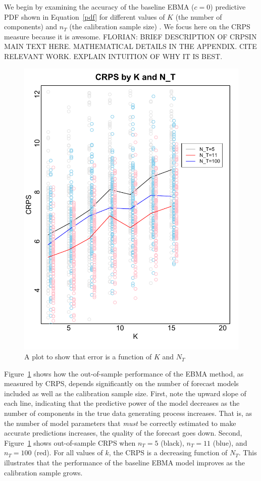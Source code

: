 \documentclass[12pt,fullpage,endnotes]{article}
\begin{document}
We begin by examining the accuracy of the baseline EBMA ($c=0$)
predictive PDF shown in Equation~\ref{pdf} for different values of $K$
(the number of components) and $n_{T}$ (the calibration sample size) .
We focus here on the CRPS measure because it is awesome.  FLORIAN:
BRIEF DESCRIPTION OF CRPSIN MAIN TEXT HERE. MATHEMATICAL DETAILS IN
THE APPENDIX.  CITE RELEVANT WORK.  EXPLAIN INTUITION OF WHY IT IS
BEST.

\begin{figure}[ht]
\caption{A plot to show that error is a function of $K$ and $N_T$}
\label{simplot1}
\centering
\includegraphics[scale=.8]{SimTemp1}
\end{figure}

Figure~\ref{simplot1} shows how the out-of-sample performance of the
EBMA method, as measured by CRPS, depends significantly on the number
of forecast models included as well as the calibration sample size.
First, note the upward slope of each line, indicating that the
predictive power of the model decreases as the number of components in
the true data generating process increases.  That is, as the number of
model parameters that \textit{must} be correctly estimated to make
accurate predictions increases, the quality of the forecast goes down.
Second, Figure~\ref{simplot1} shows out-of-sample CRPS when $n_T=5$
(black), $n_T=11$ (blue), and $n_T=100$ (red).  For all values of $k$,
the CRPS is a decreasing function of $N_T$.  This illustrates that the
performance of the baseline EBMA model improves as the calibration
sample grows.
\end{document}
